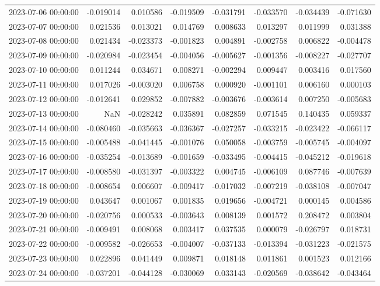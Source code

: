 \begin{tabular}{lrrrrrrr}
2023-07-06 00:00:00 & -0.019014 & 0.010586 & -0.019509 & -0.031791 & -0.033570 & -0.034439 & -0.071630 \\
2023-07-07 00:00:00 & 0.021536 & 0.013021 & 0.014769 & 0.008633 & 0.013297 & 0.011999 & 0.031388 \\
2023-07-08 00:00:00 & 0.021434 & -0.023373 & -0.001823 & 0.004891 & -0.002758 & 0.006822 & -0.004478 \\
2023-07-09 00:00:00 & -0.020984 & -0.023454 & -0.004056 & -0.005627 & -0.001356 & -0.008227 & -0.027707 \\
2023-07-10 00:00:00 & 0.011244 & 0.034671 & 0.008271 & -0.002294 & 0.009447 & 0.003416 & 0.017560 \\
2023-07-11 00:00:00 & 0.017026 & -0.003020 & 0.006758 & 0.000920 & -0.001101 & 0.006160 & 0.000103 \\
2023-07-12 00:00:00 & -0.012641 & 0.029852 & -0.007882 & -0.003676 & -0.003614 & 0.007250 & -0.005683 \\
2023-07-13 00:00:00 & NaN & -0.028242 & 0.035891 & 0.082859 & 0.071545 & 0.140435 & 0.059337 \\
2023-07-14 00:00:00 & -0.080460 & -0.035663 & -0.036367 & -0.027257 & -0.033215 & -0.023422 & -0.066117 \\
2023-07-15 00:00:00 & -0.005488 & -0.041445 & -0.001076 & 0.050058 & -0.003759 & -0.005745 & -0.004097 \\
2023-07-16 00:00:00 & -0.035254 & -0.013689 & -0.001659 & -0.033495 & -0.004415 & -0.045212 & -0.019618 \\
2023-07-17 00:00:00 & -0.008580 & -0.031397 & -0.003322 & 0.004745 & -0.006109 & 0.087746 & -0.007639 \\
2023-07-18 00:00:00 & -0.008654 & 0.006607 & -0.009417 & -0.017032 & -0.007219 & -0.038108 & -0.007047 \\
2023-07-19 00:00:00 & 0.043647 & 0.001067 & 0.001835 & 0.019656 & -0.004721 & 0.000145 & 0.004586 \\
2023-07-20 00:00:00 & -0.020756 & 0.000533 & -0.003643 & 0.008139 & 0.001572 & 0.208472 & 0.003804 \\
2023-07-21 00:00:00 & -0.009491 & 0.008068 & 0.003417 & 0.037535 & 0.000079 & -0.026797 & 0.018731 \\
2023-07-22 00:00:00 & -0.009582 & -0.026653 & -0.004007 & -0.037133 & -0.013394 & -0.031223 & -0.021575 \\
2023-07-23 00:00:00 & 0.022896 & 0.041449 & 0.009871 & 0.018148 & 0.011861 & 0.001523 & 0.012166 \\
2023-07-24 00:00:00 & -0.037201 & -0.044128 & -0.030069 & 0.033143 & -0.020569 & -0.038642 & -0.043464 \\

\end{tabular}
